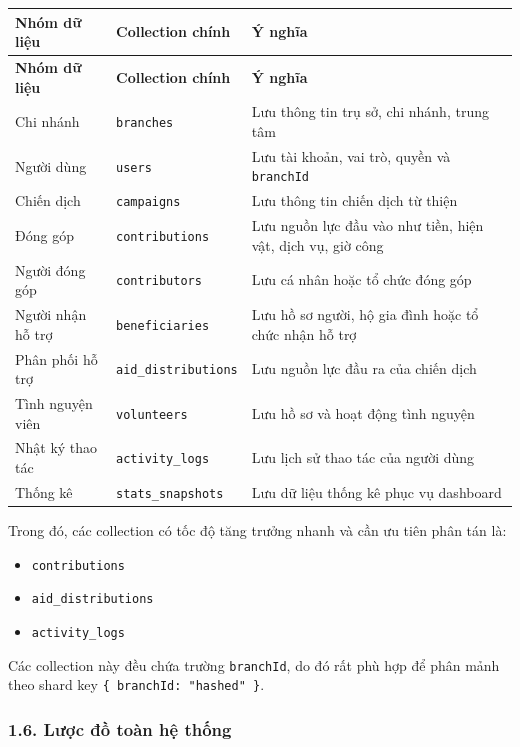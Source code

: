 \documentclass[12pt,a4paper]{article}
\begin{document}
\begin{center}
\small
\begin{longtable}{|p{2.8cm}|p{3.3cm}|p{6.2cm}|}
\hline
\textbf{Nhóm dữ liệu} & \textbf{Collection chính} & \textbf{Ý nghĩa} \\ \hline
\endfirsthead
\hline
\textbf{Nhóm dữ liệu} & \textbf{Collection chính} & \textbf{Ý nghĩa} \\ \hline
\endhead
Chi nhánh & \texttt{branches} & Lưu thông tin trụ sở, chi nhánh, trung tâm \\ \hline
Người dùng & \texttt{users} & Lưu tài khoản, vai trò, quyền và \texttt{branchId} \\ \hline
Chiến dịch & \texttt{campaigns} & Lưu thông tin chiến dịch từ thiện \\ \hline
Đóng góp & \texttt{contributions} & Lưu nguồn lực đầu vào như tiền, hiện vật, dịch vụ, giờ công \\ \hline
Người đóng góp & \texttt{contributors} & Lưu cá nhân hoặc tổ chức đóng góp \\ \hline
Người nhận hỗ trợ & \texttt{beneficiaries} & Lưu hồ sơ người, hộ gia đình hoặc tổ chức nhận hỗ trợ \\ \hline
Phân phối hỗ trợ & \texttt{aid\_distributions} & Lưu nguồn lực đầu ra của chiến dịch \\ \hline
Tình nguyện viên & \texttt{volunteers} & Lưu hồ sơ và hoạt động tình nguyện \\ \hline
Nhật ký thao tác & \texttt{activity\_logs} & Lưu lịch sử thao tác của người dùng \\ \hline
Thống kê & \texttt{stats\_snapshots} & Lưu dữ liệu thống kê phục vụ dashboard \\ \hline
\end{longtable}
\normalsize
\end{center}

Trong đó, các collection có tốc độ tăng trưởng nhanh và cần ưu tiên phân tán là:

\begin{itemize}
    \item \texttt{contributions}
    \item \texttt{aid\_distributions}
    \item \texttt{activity\_logs}
\end{itemize}

Các collection này đều chứa trường \texttt{branchId}, do đó rất phù hợp để phân mảnh theo shard key \texttt{\{ branchId: "hashed" \}}.

\subsubsection*{1.6. Lược đồ toàn hệ thống}
\end{document}
